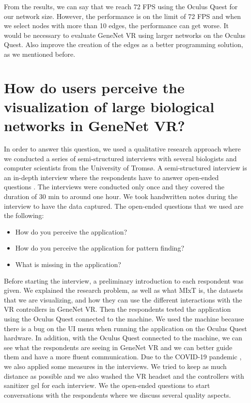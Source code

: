 From the results, we can say that we reach 72 FPS using the Oculus Quest for our network size. However, the performance is on the limit of 72 FPS and when we select nodes with more than 10 edges, the performance can get worse. It would be necessary to evaluate GeneNet VR using larger networks on the Oculus Quest. Also improve the creation of the edges as a better programming solution, as we mentioned before.

\section{How do users perceive the visualization of large biological networks in GeneNet VR?}
In order to answer this question, we used a qualitative research approach where we conducted a series of semi-structured interviews with several biologists and computer scientists from the University of Troms\o. A semi-structured interview is an in-depth interview where the respondents have to answer open-ended questions \cite{interviews}. The interviews were conducted only once and they covered the duration of 30 min to around one hour. We took handwritten notes during the interview to have the data captured. The open-ended questions that we used are the following:
\begin{itemize}
  \item How do you perceive the application?
  \item How do you perceive the application for pattern finding?
  \item What is missing in the application?
\end{itemize}

Before starting the interview, a preliminary introduction to each respondent was given. We explained the research problem, as well as what MIxT is, the datasets that we are visualizing, and how they can use the different interactions with the VR controllers in GeneNet VR. Then the respondents tested the application using the Oculus Quest connected to the machine. We used the machine because there is a bug on the UI menu when running the application on the Oculus Quest hardware. In addition, with the Oculus Quest connected to the machine, we can see what the respondents are seeing in GeneNet VR and we can better guide them and have a more fluent communication. Due to the COVID-19 pandemic \cite{covid_19}, we also applied some measures in the interviews. We tried to keep as much distance as possible and we also washed the VR headset and the controllers with sanitizer gel for each interview. We the open-ended questions to start conversations with the respondents where we discuss several quality aspects.

